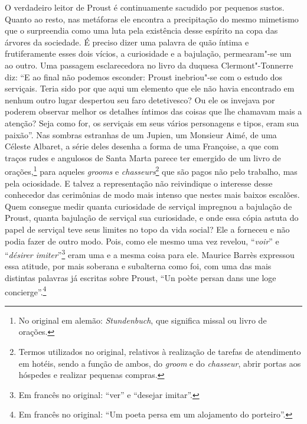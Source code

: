 O verdadeiro leitor de Proust é continuamente sacudido por pequenos
sustos. Quanto ao resto, nas metáforas ele encontra a precipitação do
mesmo mimetismo que o surpreendia como uma luta pela existência desse
espírito na copa das árvores da sociedade. É preciso dizer uma palavra
de quão íntima e frutiferamente esses dois vícios, a curiosidade e a
bajulação, permearam"-se um ao outro. Uma passagem esclarecedora no livro
da duquesa Clermont"-Tonnerre diz: ``E ao final não podemos esconder:
Proust inebriou"-se com o estudo dos serviçais. Teria sido por que aqui um
elemento que ele não havia encontrado em nenhum outro lugar despertou
seu faro detetivesco? Ou ele os invejava por poderem observar melhor os
detalhes íntimos das coisas que lhe chamavam mais a atenção? Seja como
for, os serviçais em seus vários personagens e tipos, eram sua paixão''.
Nas sombras estranhas de um Jupien, um Monsieur Aimé, de uma Céleste
Albaret, a série deles desenha a forma de uma Françoise, a que com
traços rudes e angulosos de Santa Marta parece ter emergido de um livro
de orações,\footnote{No original em alemão: \emph{Stundenbuch}, que significa
  missal ou livro de orações. \versal{[N. T.]}} para aqueles \emph{grooms} e
\emph{chasseurs}\footnote{Termos utilizados no original, relativos
  à realização de tarefas de atendimento em hotéis, sendo a função de
  ambos, do \emph{groom} e do \emph{chasseur}, abrir portas aos hóspedes
  e realizar pequenas compras. \versal{[N.~T.]}} que são pagos não pelo trabalho, mas
pela ociosidade. E talvez a representação não reivindique o interesse
desse conhecedor das cerimônias de modo mais intenso que nestes mais
baixos escalões. Quem consegue medir quanta curiosidade de serviçal
impregnou a bajulação de Proust, quanta bajulação de serviçal sua
curiosidade, e onde essa cópia astuta do papel de serviçal teve seus
limites no topo da vida social? Ele a forneceu e não podia fazer de
outro modo. Pois, como ele mesmo uma vez revelou, ``\emph{voir}'' e
``\emph{désirer imiter}''\footnote{Em francês no original: ``ver'' e ``desejar imitar''. \versal{[N. T.]}}
eram uma e a mesma coisa para ele. Maurice Barrès expressou essa
atitude, por mais soberana e subalterna como foi, com uma das mais
distintas palavras já escritas sobre Proust, ``Un poète persan dans une
loge concierge''.\footnote{Em francês no original: ``Um poeta persa em um alojamento do
  porteiro''. \versal{[N. T.]}}

